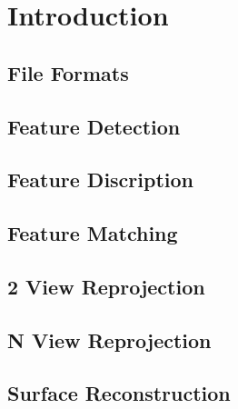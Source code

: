 
\chapter{Introduction}

\section{File Formats}

\section{Feature Detection}

\section{Feature Discription}

\section{Feature Matching}

\section{2 View Reprojection}

\section{N View Reprojection}

\section{Surface Reconstruction}
